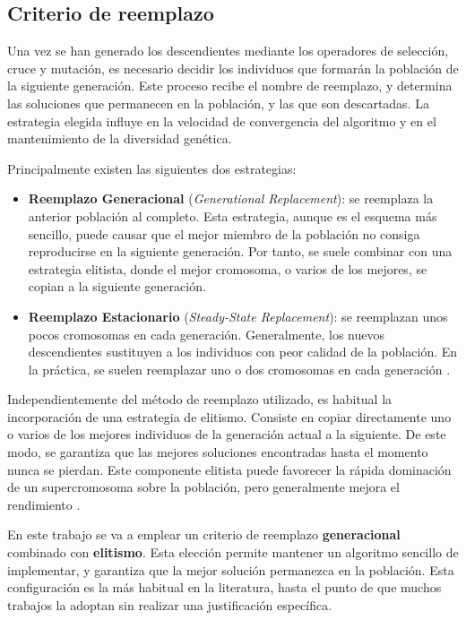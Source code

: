 \subsection{Criterio de reemplazo}
\label{subsec:replacement}

Una vez se han generado los descendientes mediante los operadores de selección, cruce y mutación, es necesario decidir los
individuos que formarán la población de la siguiente generación. Este proceso recibe el nombre de reemplazo, y determina
las soluciones que permanecen en la población, y las que son descartadas. La estrategia elegida influye en la velocidad 
de convergencia del algoritmo y en el mantenimiento de la diversidad genética.

Principalmente existen las siguientes dos estrategias:

\begin{itemize}
  \item \textbf{Reemplazo Generacional} (\textit{Generational Replacement}): se reemplaza la anterior población al completo.
  Esta estrategia, aunque es el esquema más sencillo, puede causar que el mejor miembro de la población no consiga reproducirse
  en la siguiente generación. Por tanto, se suele combinar con una estrategia elitista, donde el mejor cromosoma, o varios de 
  los mejores, se copian a la siguiente generación. 
  \item \textbf{Reemplazo Estacionario} (\textit{Steady-State Replacement}): se reemplazan unos pocos cromosomas en cada 
  generación. Generalmente, los nuevos descendientes sustituyen a los individuos con peor calidad de la población. En la
  práctica, se suelen reemplazar uno o dos cromosomas en cada generación \cite{tang1996}. 
\end{itemize}

Independientemente del método de reemplazo utilizado, es habitual la incorporación de una estrategia de elitismo. Consiste en
copiar directamente uno o varios de los mejores individuos de la generación actual a la siguiente. De este modo, se garantiza
que las mejores soluciones encontradas hasta el momento nunca se pierdan. Este componente elitista puede favorecer la rápida
dominación de un supercromosoma sobre la población, pero generalmente mejora el rendimiento \cite{tang1996}.

En este trabajo se va a emplear un criterio de reemplazo \textbf{generacional} combinado con \textbf{elitismo}. Esta elección
permite mantener un algoritmo sencillo de implementar, y garantiza que la mejor solución permanezca en la población. Esta 
configuración es la más habitual en la literatura, hasta el punto de que muchos trabajos la adoptan sin realizar una 
justificación específica. 

